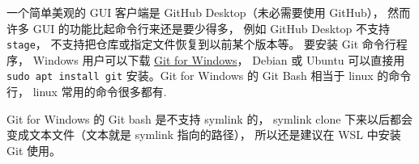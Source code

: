 

一个简单美观的 GUI 客户端是 GitHub Desktop（未必需要使用 GitHub）， 然而许多 GUI 的功能比起命令行来还是要少得多， 例如 GitHub Desktop 不支持 \verb|stage|， 不支持把仓库或指定文件恢复到以前某个版本等。 要安装 Git 命令行程序， Windows 用户可以下载 \href{https://gitforwindows.org/}{Git for Windows}， Debian 或 Ubuntu 可以直接用 \verb|sudo apt install git| 安装。Git for Windows 的 Git Bash 相当于 linux 的命令行， linux 常用的命令很多都有.

Git for Windows 的 Git bash 是不支持 symlink 的， symlink clone 下来以后都会变成文本文件（文本就是 symlink 指向的路径）， 所以还是建议在 WSL 中安装 Git 使用。

